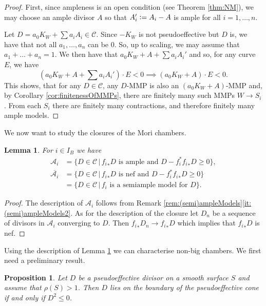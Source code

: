 \documentclass[a4paper,11pt]{amsart}
\newtheorem{lemma}[theorem]{Lemma}
\newtheorem{proposition}[theorem]{Proposition}
\newcommand{\Cc}{\mathcal{C}}
\newcommand{\Aa}{\mathcal{A}}
\newcommand{\defeq}{\vcentcolon=}
\begin{document}
\begin{proof}
	First, since ampleness is an open condition (see Theorem \ref{thm:NM}), we may choose an ample divisor $A$ so that  $A_i' \defeq A_i - A$ is ample for all $i = 1,\dots,n$.
	
	Let $D = a_0K_W + \sum a_i A_i \in \Cc$.
	Since $-K_W$ is not pseudoeffective but $D$ is, we have that not all $a_1, \dots, a_n$ can be $0$.
	So, up to scaling, we may assume that $a_1 + \ldots + a_n = 1$.
	We then have that $a_0K_W + A + \sum a_iA_i'$ and so, for any curve $E$, we have
	\[
	(a_0K_W + A + \sum a_iA_i')\cdot E < 0 \implies (a_0K_W + A)\cdot E < 0.
	\]
	This shows, that for any $D \in \Cc$, any $D$-MMP is also an  $(a_0K_W + A)$-MMP and, by Corollary \ref{cor:finitenessOfMMPs}, there are finitely many such MMPs $W \to S_i$.
	From each $S_i$ there are finitely many contractions, and therefore finitely many ample models.
\end{proof}

We now want to study the closures of the Mori chambers.

\begin{lemma}\label{lem:descrBigChamb1}
	For $i\in I_B$ we have
	\begin{align*}
		\Aa_i &= \{ D \in \Cc \,|\, {f_i}_*D \text{ is ample and } D - f_i^*{f_i}_*D \geq 0\},\\
		\overline{\Aa_i} & = \{ D \in \Cc \,|\, {f_i}_*D \text{ is nef and } D - f_i^*{f_i}_*D \geq 0\}\\
		& = \{ D \in \Cc \,|\, {f_i} \text{ is a semiample model for } D \}.
	\end{align*}
\end{lemma}


\begin{proof}
	The description of $\Aa_i$ follows from Remark \ref{rem:(semi)ampleModels}\eqref{it:(semi)ampleModels2}.
	As for the description of the closure let $D_n$ be a sequence of divisors in $\Aa_i$ converging to $D$.
	Then ${f_i}_*D_n \to {f_i}_*D$ which implies that ${f_i}_*D$ is nef.	
\end{proof}	

Using the description of Lemma \ref{lem:descrBigChamb1} we can characterise non-big chambers. 
We first need a preliminary result.

\begin{proposition}\label{prop:pseffNegative}
	Let $D$ be a pseudoeffective divisor on a smooth surface $S$ and assume that $\rho(S) > 1$.
	Then $D$ lies on the boundary of the pseudoeffective cone if and only if $D^2 \leq 0$.
\end{proposition}
\end{document}
